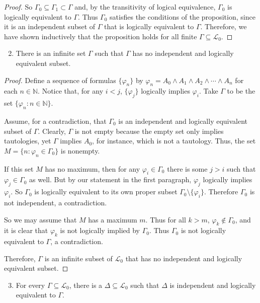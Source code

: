 \documentclass[12pt]{article}
\newcommand{\N}{\mathbb{N}}
\newenvironment{exercise}[2][Exercise]{\begin{trivlist}
\item[\hskip \labelsep {\bfseries #1}\hskip \labelsep {\bfseries #2.}]}{\end{trivlist}}
\begin{document}
\begin{exercise}{4}
\begin{proof}
So $\Gamma_0 \subseteq \Gamma_1 \subset \Gamma$ and, by the transitivity of logical equivalence, $\Gamma_0$ is logically equivalent to $\Gamma$.  Thus $\Gamma_0$ satisfies the conditions of the proposition, since it is an independent subset of $\Gamma$ that is logically equivalent to $\Gamma$.  Therefore, we have shown inductively that the proposition holds for all finite $\Gamma \subseteq \mathcal{L}_0$.

\end{proof}

\begin{enumerate}[label = \alph*)]
\setcounter{enumi}{1}
\item There is an infinite set $\Gamma$ such that $\Gamma$ has no independent and logically equivalent subset.
\end{enumerate}

\begin{proof}

Define a sequence of formulas $\{ \varphi_n \}$ by $\varphi_n = A_0 \wedge A_1 \wedge A_2 \wedge \cdots \wedge A_n$ for each $n \in \N$.  Notice that, for any $i < j$, $\{ \varphi_j \}$ logically implies $\varphi_i$.  Take $\Gamma$ to be the set $\{ \varphi_n : n \in \N \}$.

Assume, for a contradiction, that $\Gamma_0$ is an independent and logically equivalent subset of $\Gamma$.  Clearly, $\Gamma$ is not empty because the empty set only implies tautologies, yet $\Gamma$ implies $A_0$, for instance, which is not a tautology.  Thus, the set $M = \{ n : \varphi_n \in \Gamma_0 \}$ is nonempty.

If this set $M$ has no maximum, then for any $\varphi_i \in \Gamma_0$ there is some $j > i$ such that $\varphi_j \in \Gamma_0$ as well.  But by our statement in the first paragraph, $\varphi_j$ logically implies $\varphi_i$.  So $\Gamma_0$ is logically equivalent to its own proper subset $\Gamma_0 \setminus \{ \varphi_i \}$.  Therefore $\Gamma_0$ is not independent, a contradiction.

So we may assume that $M$ has a maximum $m$.  Thus for all $k > m$, $\varphi_k \not \in \Gamma_0$, and it is clear that $\varphi_k$ is not logically implied by $\Gamma_0$.  Thus $\Gamma_0$ is not logically equivalent to $\Gamma$, a contradiction.

Therefore, $\Gamma$ is an infinite subset of $\mathcal{L}_0$ that has no independent and logically equivalent subset.

\end{proof}



\begin{enumerate}[label = \alph*)]
\setcounter{enumi}{2}
\item For every $\Gamma \subseteq \mathcal{L}_0$, there is a $\Delta \subseteq \mathcal{L}_0$ such that $\Delta$ is independent and logically equivalent to $\Gamma$.
\end{enumerate}

\end{exercise}
\end{document}
